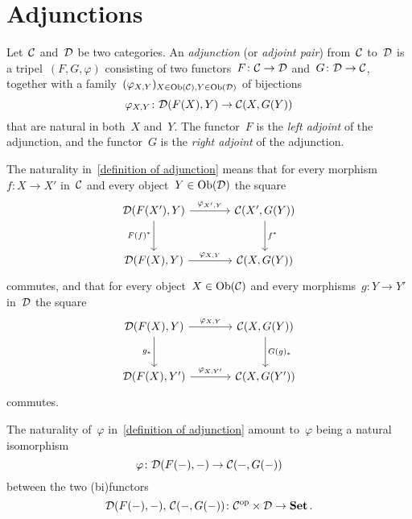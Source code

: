 \section{Adjunctions}


\begin{definition}
  \label{definition of adjunction}
  Let~$\mathcal{C}$ and~$\mathcal{D}$ be two categories.
  An \emph{adjunction} (or \emph{adjoint pair}) from~$\mathcal{C}$ to~$\mathcal{D}$ is a tripel~$(F,G,\varphi)$ consisting of two functors~$F \colon \mathcal{C} \to \mathcal{D}$ and~$G \colon \mathcal{D} \to \mathcal{C}$, together with a family~$(\varphi_{X,Y})_{X \in \operatorname{Ob}(\mathcal{C}), Y \in \operatorname{Ob}(\mathcal{D})}$ of bijections
  \[
            \varphi_{X,Y}
    \colon  \mathcal{D}(F(X), Y)
    \to     \mathcal{C}(X, G(Y))
  \]
  that are natural in both~$X$ and~$Y$.
  The functor~$F$ is the \emph{left adjoint} of the adjunction, and the functor~$G$ is the \emph{right adjoint} of the adjunction.
\end{definition}


\begin{remarknonum}
  The naturality in~\cref{definition of adjunction} means that for every morphism~$f \colon X \to X'$ in~$\mathcal{C}$ and every object~$Y \in \operatorname{Ob}(\mathcal{D})$ the square
  \[
    \begin{tikzcd}[sep = large]
        \Dcat(F(X'), Y)
        \arrow{r}[above]{\varphi_{X',Y}}
        \arrow{d}[left]{F(f)^*}
      & \Ccat(X', G(Y))
        \arrow{d}[right]{f^*}
      \\
        \Dcat(F(X), Y)
        \arrow{r}[above]{\varphi_{X,Y}}
      & \Ccat(X, G(Y))
    \end{tikzcd}
  \]
  commutes, and that for every object~$X \in \operatorname{Ob}(\mathcal{C})$ and every morphisms~$g \colon Y \to Y'$ in~$\mathcal{D}$ the square
  \[
    \begin{tikzcd}[sep = large]
        \Dcat(F(X), Y)
        \arrow{r}[above]{\varphi_{X,Y}}
        \arrow{d}[left]{g_*}
      & \Ccat(X, G(Y))
        \arrow{d}[right]{G(g)_*}
      \\
        \Dcat(F(X), Y')
        \arrow{r}[above]{\varphi_{X,Y'}}
      & \Ccat(X, G(Y'))
    \end{tikzcd}
  \]
  commutes.
\end{remarknonum}


\begin{remark*}
  The naturality of~$\varphi$ in~\cref{definition of adjunction} amount to~$\varphi$ being a natural isomorphism
  \[
            \varphi
    \colon  \mathcal{D}(F(-), -)
    \to     \mathcal{C}(-, G(-))
  \]
  between the two (bi)functors
  \[
            \mathcal{D}(F(-), -), \, \mathcal{C}(-, G(-))
    \colon  \mathcal{C}^{\mathrm{op}} \times \mathcal{D}
    \to     \mathbf{Set} \,.
  \]
\end{remark*}


